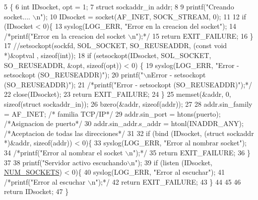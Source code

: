 \begin{DoxyCode}
5                                \{
6         \textcolor{keywordtype}{int} IDsocket, opt = 1;
7         \textcolor{keyword}{struct }sockaddr\_in addr;
8 
9         printf(\textcolor{stringliteral}{"Creando socket.... \(\backslash\)n"});
10         IDsocket = socket(AF\_INET, SOCK\_STREAM, 0);
11 
12         \textcolor{keywordflow}{if} (IDsocket < 0)\{
13                 syslog(LOG\_ERR, \textcolor{stringliteral}{"Error en la creacion del socket"});
14                 \textcolor{comment}{/*printf("Error en la creacion del socket \(\backslash\)n");*/}
15                 \textcolor{keywordflow}{return} EXIT\_FAILURE;
16         \}
17                 \textcolor{comment}{//setsockopt(sockfd, SOL\_SOCKET, SO\_REUSEADDR, (const void *)&optval , sizeof(int));}
18         \textcolor{keywordflow}{if} (setsockopt(IDsocket, SOL\_SOCKET, SO\_REUSEADDR, &opt, \textcolor{keyword}{sizeof}(opt)) < 0) \{
19                 syslog(LOG\_ERR, \textcolor{stringliteral}{"Error - setsockopt (SO\_REUSEADDR)"});
20                 printf(\textcolor{stringliteral}{"\(\backslash\)nError - setsockopt (SO\_REUSEADDR)"});
21                 \textcolor{comment}{/*printf("Error - setsockopt (SO\_REUSEADDR)");*/}
22                 close(IDsocket);
23                 \textcolor{keywordflow}{return} EXIT\_FAILURE;
24         \}
25         memset(&addr, 0, \textcolor{keyword}{sizeof}(\textcolor{keyword}{struct} sockaddr\_in));
26         bzero(&addr, \textcolor{keyword}{sizeof}(addr));
27 
28         addr.sin\_family = AF\_INET; \textcolor{comment}{/* familia TCP/IP*/}
29         addr.sin\_port = htons(puerto); \textcolor{comment}{/*Asignacion de puerto*/}
30         addr.sin\_addr.s\_addr = htonl(INADDR\_ANY); \textcolor{comment}{/*Aceptacion de todas las direcciones*/}
31 
32         \textcolor{keywordflow}{if} (bind (IDsocket, (\textcolor{keyword}{struct} sockaddr *)&addr, \textcolor{keyword}{sizeof}(addr)) < 0)\{
33                 syslog(LOG\_ERR, \textcolor{stringliteral}{"Error al nombrar socket"});
34                 \textcolor{comment}{/*printf("Error al nombrar el socket \(\backslash\)n");*/}
35                 \textcolor{keywordflow}{return} EXIT\_FAILURE;
36         \}
37 
38         printf(\textcolor{stringliteral}{"Servidor activo escuchando\(\backslash\)n"});
39         \textcolor{keywordflow}{if} (listen (IDsocket, \hyperlink{_g-2361-06-_p1-_server_8h_a1c803e4ececfb47d2791c9283c85eb00}{NUM\_SOCKETS}) < 0)\{
40                 syslog(LOG\_ERR, \textcolor{stringliteral}{"Error al escuchar"});
41                 \textcolor{comment}{/*printf("Error al escuchar \(\backslash\)n");*/}
42                 \textcolor{keywordflow}{return} EXIT\_FAILURE;
43         \}
44 
45 
46         \textcolor{keywordflow}{return} IDsocket;
47 \}
\end{DoxyCode}
